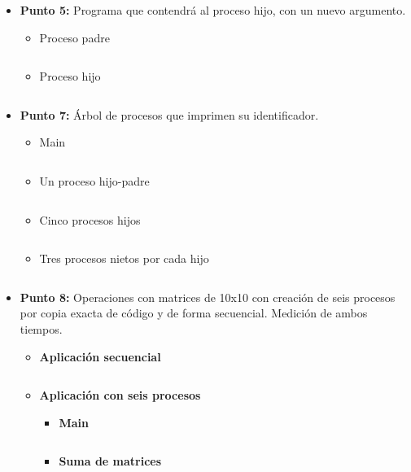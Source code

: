 \documentclass[12pt]{article}
\begin{document}
        \begin{itemize}

            \item[\Checkmark] \textbf{Punto 5:} Programa que contendrá al proceso hijo, con un nuevo argumento.
                \begin{itemize}
                    \item Proceso padre
                    \inputminted{c++}{Code/Windows/5.c}
                    
                    \item Proceso hijo
                    \inputminted{c++}{Code/Windows/5_hijo.c}
                \end{itemize}
                

            \item[\Checkmark] \textbf{Punto 7:} Árbol de procesos que imprimen su identificador.
                \begin{itemize}
                    \item Main
                    \inputminted{c++}{Code/Windows/7.c}
                    
                    \item Un proceso hijo-padre
                    \inputminted{c++}{Code/Windows/7_padre.c}
                    
                    \item Cinco procesos hijos
                    \inputminted{c++}{Code/Windows/7_hijo.c}
                    
                    \item Tres procesos nietos por cada hijo
                    \inputminted{c++}{Code/Windows/7_nieto.c}
                \end{itemize}

            \item[\Checkmark] \textbf{Punto 8:} Operaciones con matrices de 10x10 con creación de seis procesos por copia exacta de código y de forma secuencial. Medición de ambos tiempos.

                \begin{itemize}
                    \item \textbf{Aplicación secuencial}
                            \inputminted{c++}{Code/Windows/8_1.c}
                            
                        \item \textbf{Aplicación con seis procesos}
                        \begin{itemize}
                        \item \textbf{Main}
                            \inputminted{c++}{Code/Windows/8.c}
                            \newpage
                        \item \textbf{Suma de matrices}
                            \inputminted{c++}{Code/Windows/suma.c}


\end{itemize}
\end{itemize}
\end{itemize}
\end{document}
